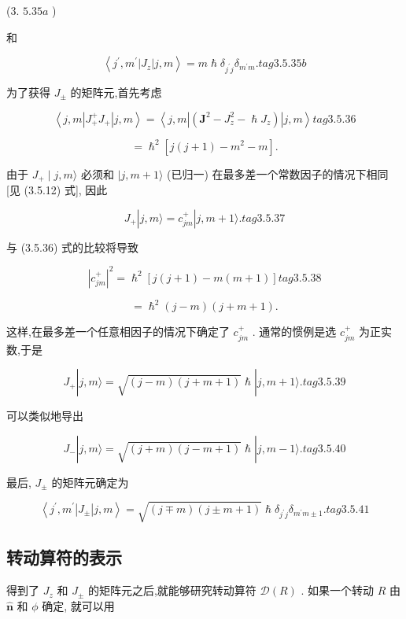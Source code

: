 (3. ${5.35a}$ )

和

$$
\left\langle {{j}^{\prime },{m}^{\prime }\left| {J}_{z}\right| j, m}\right\rangle = m\hslash {\delta }_{{j}^{\prime }j}{\delta }_{{m}^{\prime }m}. tag{3. 5.35b}
$$

为了获得 ${J}_{ \pm }$ 的矩阵元,首先考虑

$$
\left\langle {j, m\left| {{J}_{ + }^{ + }{J}_{ + }}\right| j, m}\right\rangle = \left\langle {j, m\left| \left( {{\mathbf{J}}^{2} - {J}_{z}^{2} - \hslash {J}_{z}}\right) \right| j, m}\right\rangle tag{3. 5.36}
$$

$$
= {\hslash }^{2}\left\lbrack {j\left( {j + 1}\right) - {m}^{2} - m}\right\rbrack .
$$

由于 ${J}_{ + } \mid j, m\rangle$ 必须和 $|j, m + 1\rangle$ (已归一) 在最多差一个常数因子的情况下相同 [见 (3.5.12) 式], 因此

$$
{J}_{ + }\left| {j, m\rangle = {c}_{jm}^{ + }}\right| j, m + 1\rangle . tag{3. 5.37}
$$

与 (3.5.36) 式的比较将导致

$$
{\left| {c}_{jm}^{ + }\right| }^{2} = {\hslash }^{2}\left\lbrack {j\left( {j + 1}\right) - m\left( {m + 1}\right) }\right\rbrack tag{3. 5.38}
$$

$$
= {\hslash }^{2}\left( {j - m}\right) \left( {j + m + 1}\right) \text{.}
$$

这样,在最多差一个任意相因子的情况下确定了 ${c}_{jm}^{ + }$ . 通常的惯例是选 ${c}_{jm}^{ + }$ 为正实数,于是

$$
{J}_{ + }\left| {j, m\rangle = \sqrt{\left( {j - m}\right) \left( {j + m + 1}\right) }\hslash }\right| j, m + 1\rangle . tag{3.5.39}
$$

可以类似地导出

$$
{J}_{ - }\left| {j, m\rangle = \sqrt{\left( {j + m}\right) \left( {j - m + 1}\right) }\hslash }\right| j, m - 1\rangle . tag{3. 5.40}
$$

最后, ${J}_{ \pm }$ 的矩阵元确定为

$$
\left\langle {{j}^{\prime },{m}^{\prime }\left| {J}_{ \pm }\right| j, m}\right\rangle = \sqrt{\left( {j \mp m}\right) \left( {j \pm m + 1}\right) }\hslash {\delta }_{{j}^{\prime }j}{\delta }_{{m}^{\prime }m \pm 1}. tag{3. 5.41}
$$

\subsection{转动算符的表示}

得到了 ${J}_{z}$ 和 ${J}_{ \pm }$ 的矩阵元之后,就能够研究转动算符 $\mathcal{D}\left( R\right)$ . 如果一个转动 $R$ 由 $\widehat{\mathbf{n}}$ 和 $\phi$ 确定, 就可以用

